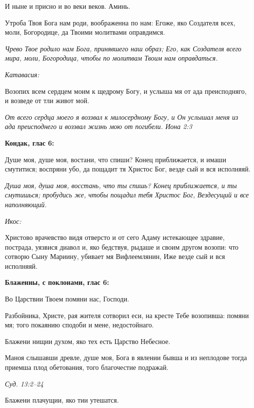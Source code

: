И ныне и присно и во веки веков. Аминь.


Утроба Твоя Бога нам роди, воображенна по нам: Егоже, яко Создателя всех, моли, Богородице, да Твоими молитвами оправдимся.


\itshape Чрево Твое родило нам Бога, принявшего наш образ; Его, как Создателя всего мира, моли, Богородица, чтобы по молитвам Твоим нам оправдаться.\normalfont{}


\itshape Катавасия:\normalfont{}


Возопих всем сердцем моим к щедрому Богу, и услыша мя от ада преисподняго, и возведе от тли живот мой.


\itshape От всего сердца моего я воззвал к милосердному Богу, и Он услышал меня из ада преисподнего и воззвал жизнь мою от погибели. Иона 2:3\normalfont{}





\bfseries Кондак, глас 6:\normalfont{}


Душе моя, душе моя, востани, что спиши? Конец приближается, и имаши смутитися; воспряни убо, да пощадит тя Христос Бог, везде сый и вся исполняяй.


\itshape Душа моя, душа моя, восстань, что ты спишь? Конец приближается, и ты смутишься; пробудись же, чтобы пощадил тебя Христос Бог, Вездесущий и все наполняющий.\normalfont{}


\itshape Икос:\normalfont{}


Христово врачевство видя отверсто и от сего Адаму истекающее здравие, пострада, уязвися диавол и, яко бедствуя, рыдаше и своим другом возопи: что сотворю Сыну Мариину, убивает мя Вифлеемлянин, Иже везде сый и вся исполняяй.





\bfseries Блаженны, с поклонами, глас 6:\normalfont{}


Во Царствии Твоем помяни нас, Господи.


Разбойника, Христе, рая жителя сотворил еси, на кресте Тебе возопивша: помяни мя; того покаянию сподоби и мене, недостойнаго.


Блажени нищии духом, яко тех есть Царство Небесное.


Маноя слышавши древле, душе моя, Бога в явлении бывша и из неплодове тогда приемша плод обетования, того благочестие подражай.


\itshape Суд. 13:2–24\normalfont{}


Блажени плачущии, яко тии утешатся.



